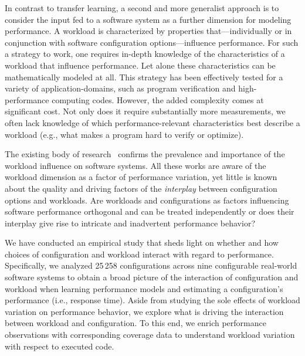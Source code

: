 In contrast to transfer learning, a second and more generalist approach is to consider the input fed to a software system as a further dimension for modeling performance. A workload is characterized by properties that---individually or in conjunction with software configuration options---influence performance. For such a strategy to work, one requires in-depth knowledge of the characteristics of a workload that influence performance. Let alone these characteristics can be mathematically modeled at all. This strategy has been effectively tested for a  variety of application-domains, such as program verification and high-performance computing codes. However, the added complexity comes at significant cost. 
Not only does it require substantially more measurements, we often lack knowledge of which performance-relevant characteristics best describe a workload (e.g., what makes a program hard to verify or optimize).


The existing body of research~\cite{dorn2020,siegmundPerformanceinfluenceModelsHighly2015,haDeepPerf2019,perfAL,guoVariabilityawarePerformancePrediction2013,sarkarCostEfficientSamplingPerformance,guo_2018_data,fourier_learning_2015,perLasso,chen_hinnperf_2022,chen_mmo_2021,nairUsingBadLearners2017,nairFlash18,ohFindingNearoptimalConfigurations2017} confirms the prevalence and importance of the workload influence on software systems. All these works are aware of the workload dimension as a factor of performance variation, yet little is known about the quality and driving factors of the \emph{interplay} between configuration options and workloads. {\color{blue} Are workloads and configurations as factors influencing software performance orthogonal and can be treated independently or does their interplay give rise to intricate and inadvertent performance behavior?}

We have conducted an empirical study that sheds light on whether and how choices of configuration and workload interact with regard to performance. 
Specifically, we analyzed 25\,258 configurations across nine configurable real-world software systems to obtain a broad picture of the interaction of configuration and workload when learning performance models and estimating a configuration's performance (i.e., response time). Aside from studying the sole effects of workload variation on performance behavior, we explore what is driving the interaction between workload and configuration. To this end, we enrich performance observations with corresponding coverage data to understand workload variation with respect to executed code.

